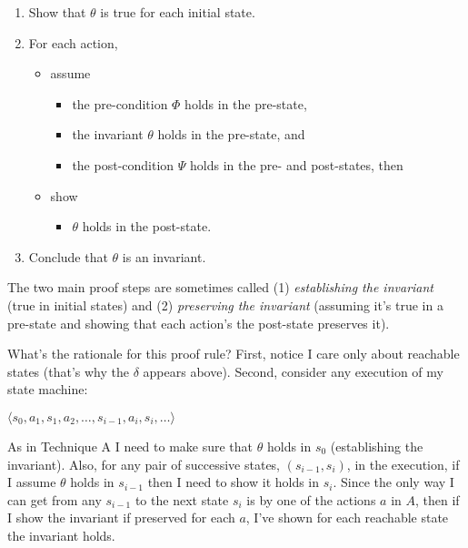 \begin{enumerate}
\item Show that $\theta$ is true for each initial state.

\item For each action,
\begin{itemize}

\item assume
\begin{itemize}
\item the pre-condition $\Phi$ holds in the pre-state,
\item the invariant $\theta$ holds in the pre-state, and
\item the post-condition $\Psi$ holds in the pre- and post-states, then
\end{itemize}

\item show
\begin{itemize}
\item $\theta$ holds in the post-state.
\end{itemize}

\end{itemize}

\item Conclude that $\theta$ is an invariant.
\end{enumerate}

The two main proof steps are sometimes called
(1) {\em establishing the invariant} (true in initial states)
and (2) {\em preserving the invariant} (assuming it's true in
a pre-state and showing that each action's the post-state preserves it).

What's the rationale for this proof rule?  First, notice I care only
about reachable states (that's why the $\delta$ appears above).
Second, consider any execution of my state machine:

\begin{center}

$\langle s_0,  a_1, s_1, a_2,  \ldots,  s_{i-1}, a_i,  s_i, \dots \rangle $ 

\end{center}

\noindent As in Technique A I need to make sure that $\theta$ holds in $s_0$
(establishing the invariant).  Also,
for any pair of successive states, $(s_{i-1}, s_i)$, in
the
execution, if I assume $\theta$ holds in $s_{i-1}$ then I need to show
it holds in $s_i$.  Since the only way I can get from any $s_{i-1}$ to
the next state $s_i$ is by one of the actions $a$ in $A$, then if I
show the invariant if preserved for each $a$, I've shown for each
reachable state
the
invariant holds.

